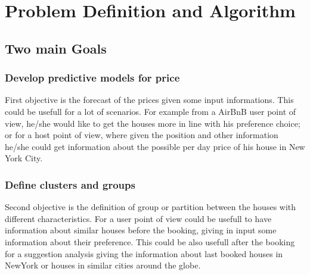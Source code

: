 \documentclass{FR16}
\begin{document}

\newpage
\section{Problem Definition and Algorithm}
\subsection{Two main Goals}

\subsubsection{Develop predictive models for price}
First objective is the forecast of the prices given some input informations. This could be usefull for a lot of scenarios. For example from a AirBnB user point of view, he/she would like to get the houses more in line with his preference choice; or for a host point of view, where given the position and other information he/she could get information about the possible per day price of his house in New York City. 

\subsubsection{Define clusters and groups}
Second objective is the definition of group or partition between the houses with different characteristics. For a user point of view could be usefull to have information about similar houses before the booking, giving in input some information about their preference. This could be also usefull after the booking for a suggestion analysis giving the information about last booked houses in NewYork or houses in similar cities around the globe.
\\\\
\end{document}
